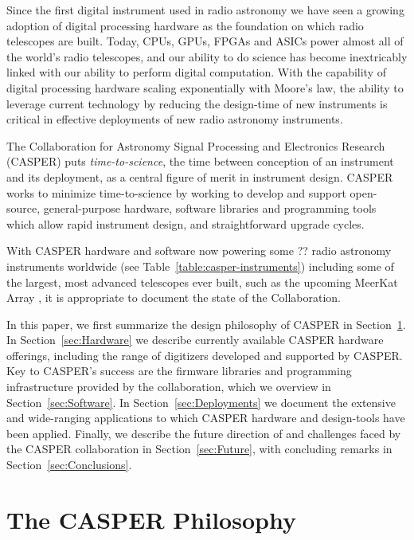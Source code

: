 \documentclass{ws-jai}
\begin{document}
Since the first digital instrument used in radio astronomy \citep{Weinreb} we
have seen a growing adoption of digital processing hardware as the foundation on
which radio telescopes are built.  Today, CPUs, GPUs, FPGAs and ASICs power
almost all of the world's radio telescopes, and our ability to do science has
become inextricably linked with our ability to perform digital computation.
With the capability of digital processing hardware scaling exponentially with
Moore's law, the ability to leverage current technology by reducing the
design-time of new instruments is critical in effective deployments of new radio
astronomy instruments.

The Collaboration for Astronomy Signal Processing and Electronics Research
(CASPER) puts \emph{time-to-science}, the time between conception of an
instrument and its deployment, as a central figure of merit in instrument
design. CASPER works to minimize time-to-science by working to develop and
support open-source, general-purpose hardware, software libraries and
programming tools which allow rapid instrument design, and straightforward
upgrade cycles.

With CASPER hardware and software now powering some ?? radio astronomy
instruments worldwide (see Table~\ref{table:casper-instruments}) including some
of the largest, most advanced telescopes ever built, such as the upcoming
MeerKat Array \citep{MeerKAT}, it is appropriate to document the state of the
Collaboration.

In this paper, we first summarize the design philosophy of CASPER in
Section~\ref{sec:CASPER-philosophy}.  In Section~\ref{sec:Hardware} we describe
currently available CASPER hardware offerings, including the range of digitizers
developed and supported by CASPER. Key to CASPER's success are the firmware
libraries and programming infrastructure provided by the collaboration, which we
overview in Section~\ref{sec:Software}.  In Section~\ref{sec:Deployments} we
document the extensive and wide-ranging applications to which CASPER hardware
and design-tools have been applied. Finally, we describe the future direction of
and challenges faced by the CASPER collaboration in Section~\ref{sec:Future},
with concluding remarks in Section~\ref{sec:Conclusions}.

\section{The CASPER Philosophy} \label{sec:CASPER-philosophy}
\end{document}

